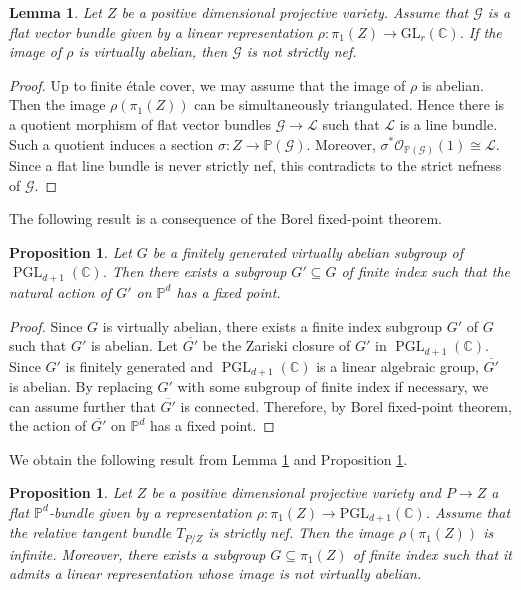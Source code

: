 \documentclass[english,reqno]{amsart}
\newcommand\bbC{{\mathbb C}}
\newcommand\bbP{{\mathbb P}}
\newcommand\sG{{\mathscr G}}
\newcommand\sL{{\mathscr L}}
\newcommand\sO{{\mathscr O}}
\DeclareMathOperator*{\PGL}{PGL}
\theoremstyle{plain}
\newtheorem{lemma}[thm]{Lemma}
\newtheorem{prop}[thm]{Proposition}
\theoremstyle{definition}
\numberwithin{equation}{section} %
\begin{document}
\begin{lemma}
	\label{lemma:representation-vir-abelian-not-strictly-nef}
	Let $Z$ be a positive dimensional projective variety.  Assume that $\sG$ is a flat vector bundle given by a linear representation   $\rho\colon \pi_1(Z) \to \mathrm{GL}_r(\bbC)$. If the image of $\rho$  is virtually abelian,  then $\sG$ is not strictly nef.
\end{lemma}


\begin{proof}
	Up to finite \'etale cover, we may assume that the image of $\rho$ is abelian.  Then the image $\rho(\pi_1(Z))$ can be simultaneously triangulated. Hence there is a quotient morphism of flat vector bundles $\sG \to \sL$ such that $\sL$ is a line bundle. Such a quotient induces a section $\sigma\colon Z \to \bbP(\sG)$. Moreover, $\sigma^*\sO_{\bbP(\sG)}(1) \cong \sL$. Since a flat line bundle is never strictly nef, this contradicts to the strict nefness of $\sG$.
\end{proof}

The following result  is a consequence of the Borel  fixed-point theorem.

\begin{prop}
	\label{prop:fixed-point}
	Let $G$ be a finitely generated virtually abelian subgroup of $\PGL_{d+1}(\bbC)$. Then there exists a subgroup $G'\subseteq G$ of finite index such that the natural action of $G'$ on $\bbP^d$ has a fixed point.
\end{prop}

\begin{proof}
	Since $G$ is virtually abelian, there exists a finite index subgroup $G'$ of $G$ such that $G'$ is abelian. Let $\overline{G'}$ be the Zariski closure of $G'$ in $\PGL_{d+1}(\bbC)$. Since $G'$ is finitely generated and $\PGL_{d+1}(\bbC)$ is a linear algebraic group, $\overline{G'}$ is  abelian.
	By replacing $G'$ with some subgroup of finite index if necessary, we can assume further that $\overline{G'}$ is connected. Therefore, by Borel  fixed-point theorem, the action  of $\overline{G'} $ on $\bbP^d$ has a fixed point.
\end{proof}


We obtain the following result from Lemma \ref{lemma:representation-vir-abelian-not-strictly-nef} and Proposition \ref{prop:fixed-point}.

\begin{prop}
	\label{prop:representation-non-abelian}
	Let $Z$ be a positive dimensional projective variety  and  $P\rightarrow Z$ a flat $\bbP^d$-bundle given by a representation $\rho\colon \pi_1(Z) \to \mathrm{PGL}_{d+1}(\bbC)$. Assume that  the relative tangent bundle $T_{P/Z}$ is strictly nef. Then  the image $\rho(\pi_1(Z))$ is infinite. Moreover, there exists   a  subgroup  $G\subseteq \pi_1(Z)$ of finite index such that it  admits a linear representation whose image is not virtually abelian.
\end{prop}
\end{document}

